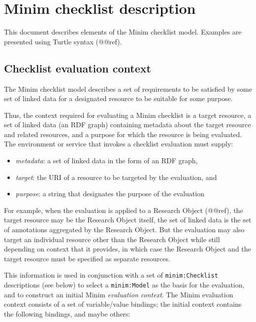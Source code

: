 \documentclass[]{article}
\author{}
\date{}
\begin{document}
{
\hypersetup{linkcolor=black}
\setcounter{tocdepth}{3}
\tableofcontents
}
\section{Minim checklist description}

This document describes elements of the Minim checklist model. Examples
are presented using Turtle syntax (@@ref).

\subsection{Checklist evaluation context}

The Minim checklist model describes a set of requirements to be
satisfied by some set of linked data for a designated resource to be
suitable for some purpose.

Thus, the context required for evaluating a Minim checklist is a target
resource, a set of linked data (an RDF graph) containing metadata about
the target resource and related resources, and a purpose for which the
resource is being evaluated. The environment or service that invokes a
checklist evaluation must supply:

\begin{itemize}
\itemsep1pt\parskip0pt
\item
  \emph{metadata}: a set of linked data in the form of an RDF graph,
\item
  \emph{target}: the URI of a resource to be targeted by the evaluation,
  and
\item
  \emph{purpose}: a string that designates the purpose of the evaluation
\end{itemize}

For example, when the evaluation is applied to a Research Object
(@@ref), the target resource may be the Research Object itself, the set
of linked data is the set of annotations aggregated by the Research
Object. But the evaluation may also target an individual resource other
than the Research Object while still depending on context that it
provides, in which case the Research Object and the target resource must
be specified as separate resources.

This information is used in conjunction with a set of
\texttt{minim:Checklist} descriptions (see below) to select a
\texttt{minim:Model} as the basis for the evaluation, and to construct
an initial Minim \emph{evaluation context}. The Minim evaluation context
consists of a set of variable/value bindings; the initial context
contains the following bindings, and maybe others:
\end{document}
